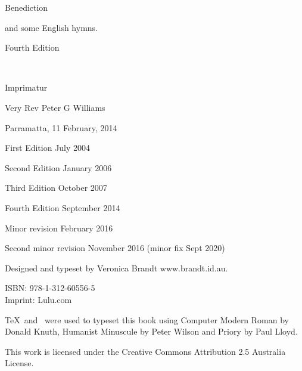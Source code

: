 \centerline{Benediction}

\bigskip

\centerline{and some English hymns.}

\vfill

\centerline{Fourth Edition}

\bigskip

\eject




\ 

\vfill

{\raggedright
{}

\parindent=0mm
\parskip=6pt

Imprimatur
\centerline{Very Rev Peter G Williams}
\rmlyrics

Parramatta, 11 February, 2014

\vfill

First Edition July 2004

Second Edition January 2006

Third Edition October 2007


Fourth Edition September 2014

\qquad Minor revision February 2016

\qquad Second minor revision November 2016 (minor fix Sept 2020)

Designed and typeset by Veronica Brandt www.brandt.id.au.

ISBN: 978-1-312-60556-5\\
Imprint: Lulu.com

\TeX\ and \OpusTeX\ were used to typeset this book using
          Computer Modern Roman by Donald Knuth,
          Humanist Minuscule by Peter Wilson
          and Priory by Paul Lloyd.


This work is licensed under the Creative Commons 
Attribution 2.5 Australia License. 

}

